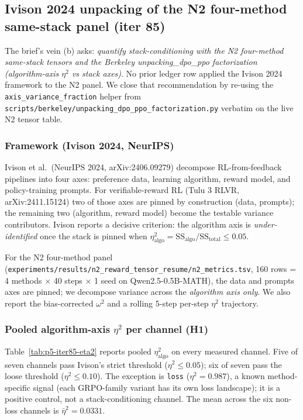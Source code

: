 \subsection{Ivison 2024 unpacking of the N2 four-method same-stack panel (iter 85)}
\label{sec:p5-iter85-ivison-unpacking}

The brief's vein (b) asks: \emph{quantify stack-conditioning with the N2
four-method same-stack tensors and the Berkeley unpacking\_dpo\_ppo
factorization (algorithm-axis $\eta^2$ vs stack axes)}. No prior ledger
row applied the Ivison 2024 framework to the N2 panel. We close that
recommendation by re-using the \texttt{axis\_variance\_fraction} helper
from \texttt{scripts/berkeley/unpacking\_dpo\_ppo\_factorization.py}
verbatim on the live N2 tensor table.

\subsubsection{Framework (Ivison 2024, NeurIPS)}
\label{sec:p5-iter85-ivison-framework}
Ivison et al.~(NeurIPS 2024, arXiv:2406.09279) decompose RL-from-feedback
pipelines into four axes: preference data, learning algorithm, reward
model, and policy-training prompts. For verifiable-reward RL (Tulu 3 RLVR,
arXiv:2411.15124) two of those axes are pinned by construction (data,
prompts); the remaining two (algorithm, reward model) become the
testable variance contributors. Ivison reports a decisive criterion:
the algorithm axis is \emph{under-identified} once the stack is pinned
when $\eta^2_{\mathrm{algo}} = \mathrm{SS}_{\mathrm{algo}}/\mathrm{SS}_{\mathrm{total}}
\le 0.05$.

For the N2 four-method panel (\texttt{experiments/results/n2\_reward\_tensor\_resume/n2\_metrics.tsv},
160 rows = 4 methods $\times$ 40 steps $\times$ 1 seed on
Qwen2.5-0.5B-MATH), the data and prompts axes are pinned; we decompose
variance across the \emph{algorithm axis only}. We also report the
bias-corrected $\omega^2$ and a rolling 5-step per-step $\eta^2$ trajectory.

\subsubsection{Pooled algorithm-axis $\eta^2$ per channel (H1)}
\label{sec:p5-iter85-pooled}
Table~\ref{tab:p5-iter85-eta2} reports pooled $\eta^2_{\mathrm{algo}}$
on every measured channel. Five of seven channels pass Ivison's strict
threshold ($\eta^2 \le 0.05$); six of seven pass the loose threshold
($\eta^2 \le 0.10$). The exception is \texttt{loss} ($\eta^2 = 0.987$),
a known method-specific signal (each GRPO-family variant has its own loss
landscape); it is a positive control, not a stack-conditioning channel.
The mean across the six non-loss channels is $\bar\eta^2 = 0.0331$.

